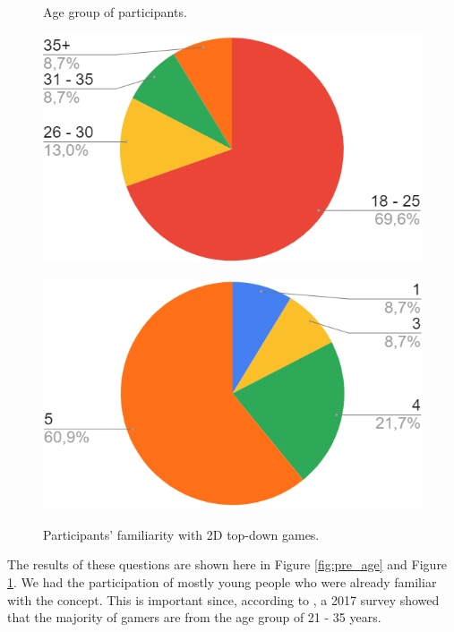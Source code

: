 \begin{figure}[h]
  \centering
  \begin{minipage}[b]{0.4\textwidth}
    \caption{Age group of participants.}
    \includegraphics[width=\textwidth]{images/survey/pretest_age.png}
    \label{fig:pre_age}
  \end{minipage}
  \hfill
  \begin{minipage}[b]{0.4\textwidth}
    \caption{Participants' familiarity with 2D top-down games.}
    \includegraphics[width=\textwidth]{images/survey/pretest_played.png}
    \label{fig:pre_game}
  \end{minipage}
\end{figure}

The results of these questions are shown here in Figure \ref{fig:pre_age} and Figure \ref{fig:pre_game}. We had the participation of mostly young people who were already familiar with the concept. This is important since, according to \cite{statista:2017}, a 2017 survey showed that the majority of gamers are from the age group of 21 - 35 years.

